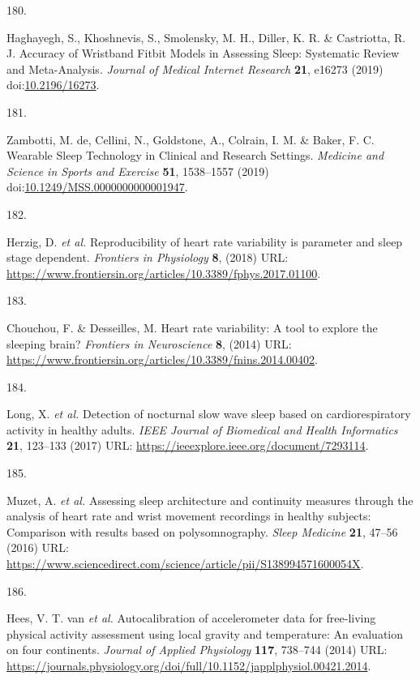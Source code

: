 \documentclass[
  10pt,
]{scrbook}
\newlength{\cslhangindent}
\newlength{\csllabelwidth}
\newlength{\cslentryspacingunit} %
\newenvironment{CSLReferences}[2] %
 {%
  \setlength{\parindent}{0pt}
  \ifodd #1
  \let\oldpar\par
  \def\par{\hangindent=\cslhangindent\oldpar}
  \fi
  \setlength{\parskip}{#2\cslentryspacingunit}
 }%
 {}
\newcommand{\CSLLeftMargin}[1]{\parbox[t]{\csllabelwidth}{#1}}
\newcommand{\CSLRightInline}[1]{\parbox[t]{\linewidth - \csllabelwidth}{#1}\break}
\let\originaltextbf\textbf
\renewcommand{\textbf}[1]{\textcolor{color1}{\originaltextbf{#1}}}
\begin{document}
\begin{CSLReferences}{0}{0}
\leavevmode{}%
\CSLLeftMargin{180. }%
\CSLRightInline{Haghayegh, S., Khoshnevis, S., Smolensky, M. H., Diller,
K. R. \& Castriotta, R. J. Accuracy of Wristband Fitbit Models in
Assessing Sleep: Systematic Review and Meta-Analysis. \emph{Journal of
Medical Internet Research} \textbf{21}, e16273 (2019)
doi:\href{https://doi.org/10.2196/16273}{10.2196/16273}.}

\leavevmode{}%
\CSLLeftMargin{181. }%
\CSLRightInline{Zambotti, M. de, Cellini, N., Goldstone, A., Colrain, I.
M. \& Baker, F. C. Wearable Sleep Technology in Clinical and Research
Settings. \emph{Medicine and Science in Sports and Exercise}
\textbf{51}, 1538--1557 (2019)
doi:\href{https://doi.org/10.1249/MSS.0000000000001947}{10.1249/MSS.0000000000001947}.}

\leavevmode{}%
\CSLLeftMargin{182. }%
\CSLRightInline{Herzig, D. \emph{et al.} Reproducibility of heart rate
variability is parameter and sleep stage dependent. \emph{Frontiers in
Physiology} \textbf{8}, (2018) URL:
\url{https://www.frontiersin.org/articles/10.3389/fphys.2017.01100}.}

\leavevmode{}%
\CSLLeftMargin{183. }%
\CSLRightInline{Chouchou, F. \& Desseilles, M. Heart rate variability: A
tool to explore the sleeping brain? \emph{Frontiers in Neuroscience}
\textbf{8}, (2014) URL:
\url{https://www.frontiersin.org/articles/10.3389/fnins.2014.00402}.}

\leavevmode{}%
\CSLLeftMargin{184. }%
\CSLRightInline{Long, X. \emph{et al.} Detection of nocturnal slow wave
sleep based on cardiorespiratory activity in healthy adults. \emph{IEEE
Journal of Biomedical and Health Informatics} \textbf{21}, 123--133
(2017) URL: \url{https://ieeexplore.ieee.org/document/7293114}.}

\leavevmode{}%
\CSLLeftMargin{185. }%
\CSLRightInline{Muzet, A. \emph{et al.} Assessing sleep architecture and
continuity measures through the analysis of heart rate and wrist
movement recordings in healthy subjects: Comparison with results based
on polysomnography. \emph{Sleep Medicine} \textbf{21}, 47--56 (2016)
URL:
\url{https://www.sciencedirect.com/science/article/pii/S138994571600054X}.}

\leavevmode{}%
\CSLLeftMargin{186. }%
\CSLRightInline{Hees, V. T. van \emph{et al.} Autocalibration of
accelerometer data for free-living physical activity assessment using
local gravity and temperature: An evaluation on four continents.
\emph{Journal of Applied Physiology} \textbf{117}, 738--744 (2014) URL:
\url{https://journals.physiology.org/doi/full/10.1152/japplphysiol.00421.2014}.}

\end{CSLReferences}
\end{document}
